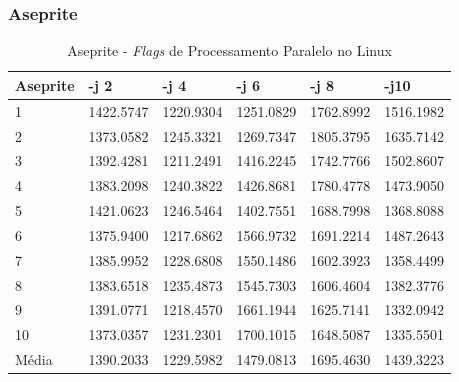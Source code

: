 \begin{apendicesenv}
\clearpage
\subsubsection*{Aseprite}

\begin{table}[!ht]
\centering
\tiny
\caption{Aseprite - \textit{Flags} de Processamento Paralelo no Linux}
\label{tab:flag_processamento_paralelo:linux:aseprite}
\begin{tabular}{llllll}
\textbf{Aseprite} & \textbf{-j 2} & \textbf{-j 4} & \textbf{-j 6} & \textbf{-j 8} & \textbf{-j10}  \\ \toprule
1                 &  1422.5747    &     1220.9304 &     1251.0829 &     1762.8992 &  1516.1982    \\ 
2                 &  1373.0582    &     1245.3321 &     1269.7347 &     1805.3795 &  1635.7142    \\ 
3                 &  1392.4281    &     1211.2491 &     1416.2245 &     1742.7766 &  1502.8607    \\ 
4                 &  1383.2098    &     1240.3822 &     1426.8681 &     1780.4778 &  1473.9050    \\ 
5                 &  1421.0623    &     1246.5464 &     1402.7551 &     1688.7998 &  1368.8088    \\ 
6                 &  1375.9400    &     1217.6862 &     1566.9732 &     1691.2214 &  1487.2643    \\ 
7                 &  1385.9952    &     1228.6808 &     1550.1486 &     1602.3923 &  1358.4499    \\ 
8                 &  1383.6518    &     1235.4873 &     1545.7303 &     1606.4604 &  1382.3776    \\ 
9                 &  1391.0771    &     1218.4570 &     1661.1944 &     1625.7141 &  1332.0942    \\ 
10                &  1373.0357    &     1231.2301 &     1700.1015 &     1648.5087 &  1335.5501    \\ \bottomrule
Média             &  1390.2033    &     1229.5982 &     1479.0813 &     1695.4630 &  1439.3223    \\ 
\end{tabular}
\end{table}


\end{apendicesenv}
